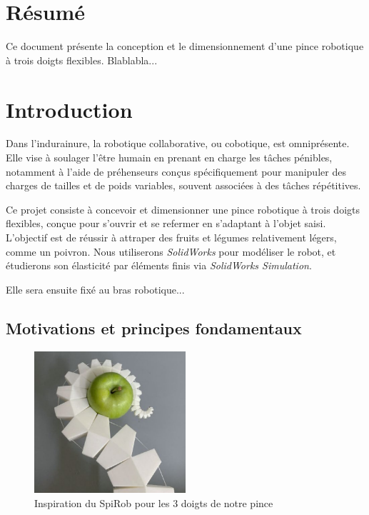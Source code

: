 \documentclass[a4paper, 11pt]{report}
\begin{document}
\clearpage
\section*{Résumé}
Ce document présente la conception et le dimensionnement d'une pince robotique à trois doigts flexibles. Blablabla...

\clearpage
\tableofcontents
\clearpage

\section{Introduction}

    Dans l'indurainure, la robotique collaborative, ou cobotique, est omniprésente. Elle vise à soulager l’être humain en prenant en charge les tâches pénibles, notamment à l’aide de préhenseurs conçus spécifiquement pour manipuler des charges de tailles et de poids variables, souvent associées à des tâches répétitives. \cite{noauthor_cobotique_nodate}

    Ce projet consiste à concevoir et dimensionner une pince robotique à trois doigts flexibles, conçue pour s'ouvrir et se refermer en s'adaptant à l'objet saisi. L'objectif est de réussir à attraper des fruits et légumes relativement légers, comme un poivron. Nous utiliserons \textit{SolidWorks} pour modéliser le robot, et étudierons son élasticité par éléments finis via \textit{SolidWorks Simulation}.

    Elle sera ensuite fixé au bras robotique...

    \subsection{Motivations et principes fondamentaux}

        \begin{figure}
            \centering
            \includegraphics[width=0.5\textwidth]{Figures/pieuvre.png}
            \caption{Inspiration du SpiRob pour les 3 doigts de notre pince \cite{wang_spirobs_2025}}
            \label{fig:pieuvre}
        \end{figure}
    
\end{document}
